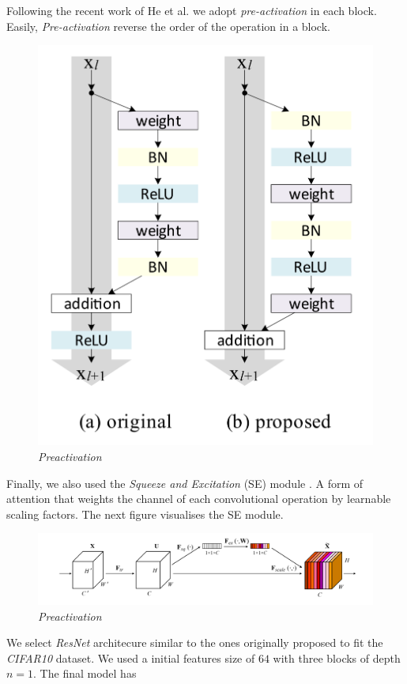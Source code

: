 \documentclass[../document.tex]{subfiles}
\begin{document}
Following the recent work of He et al. \cite{he2015identity} we adopt \emph{pre-activation} in each block. Easily, \emph{Pre-activation} reverse the order of the operation in a block.
\begin{figure}[H]
	\centering
	\includegraphics[scale=0.3]{img/implementation/estimator/preactivation.png}
	\caption{\emph{Preactivation}}
\end{figure}
Finally, we also used the \emph{Squeeze and Excitation} (SE) module \cite{hu2017squeeze}. A form of attention that weights the channel of each convolutional operation by learnable scaling factors. The next figure visualises the SE module.
\begin{figure}[H]
	\centering
	\includegraphics[width=\linewidth]{img/implementation/estimator/se.png}
	\caption{\emph{Preactivation}}
\end{figure}
We select \emph{ResNet} architecure similar to the ones originally proposed to fit the \emph{CIFAR10} \cite{cifar} dataset. We used a initial features size of $64$ with three blocks of depth $n=1$. The final model has 

\end{document}
